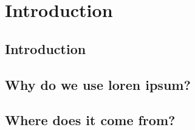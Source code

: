 
\chapter{Introduction}  %

\ifpdf
    \graphicspath{{Chapter1/Figs/Raster/}{Chapter1/Figs/PDF/}{Chapter1/Figs/}}
\else
    \graphicspath{{Chapter1/Figs/Vector/}{Chapter1/Figs/}}
\fi


\section{Introduction} %





\section{Why do we use loren ipsum?} %



\section{Where does it come from?}  %
\label{section1.3}

